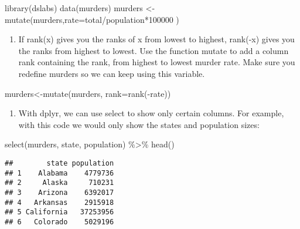\documentclass[
]{article}
\newenvironment{Shaded}{\begin{snugshade}}{\end{snugshade}}
\newcommand{\AttributeTok}[1]{\textcolor[rgb]{0.77,0.63,0.00}{#1}}
\newcommand{\DecValTok}[1]{\textcolor[rgb]{0.00,0.00,0.81}{#1}}
\newcommand{\FunctionTok}[1]{\textcolor[rgb]{0.00,0.00,0.00}{#1}}
\newcommand{\NormalTok}[1]{#1}
\newcommand{\OtherTok}[1]{\textcolor[rgb]{0.56,0.35,0.01}{#1}}
\newcommand{\SpecialCharTok}[1]{\textcolor[rgb]{0.00,0.00,0.00}{#1}}
\providecommand{\tightlist}{%
  \setlength{\itemsep}{0pt}\setlength{\parskip}{0pt}}
\begin{document}
\begin{Shaded}
\begin{Highlighting}[]
\FunctionTok{library}\NormalTok{(dslabs)}
\FunctionTok{data}\NormalTok{(murders)}
\NormalTok{murders }\OtherTok{\textless{}{-}} \FunctionTok{mutate}\NormalTok{(murders,}\AttributeTok{rate=}\NormalTok{total}\SpecialCharTok{/}\NormalTok{population}\SpecialCharTok{*}\DecValTok{100000}\NormalTok{ )}
\end{Highlighting}
\end{Shaded}

\begin{enumerate}
\def\labelenumi{\arabic{enumi}.}
\setcounter{enumi}{1}
\tightlist
\item
  If rank(x) gives you the ranks of x from lowest to highest, rank(-x)
  gives you the ranks from highest to lowest. Use the function mutate to
  add a column rank containing the rank, from highest to lowest murder
  rate. Make sure you redefine murders so we can keep using this
  variable.
\end{enumerate}

\begin{Shaded}
\begin{Highlighting}[]
\NormalTok{murders}\OtherTok{\textless{}{-}}\FunctionTok{mutate}\NormalTok{(murders, }\AttributeTok{rank=}\FunctionTok{rank}\NormalTok{(}\SpecialCharTok{{-}}\NormalTok{rate))}
\end{Highlighting}
\end{Shaded}

\begin{enumerate}
\def\labelenumi{\arabic{enumi}.}
\setcounter{enumi}{2}
\tightlist
\item
  With dplyr, we can use select to show only certain columns. For
  example, with this code we would only show the states and population
  sizes:
\end{enumerate}

\begin{Shaded}
\begin{Highlighting}[]
\FunctionTok{select}\NormalTok{(murders, state, population) }\SpecialCharTok{\%\textgreater{}\%} \FunctionTok{head}\NormalTok{()}
\end{Highlighting}
\end{Shaded}

\begin{verbatim}
##        state population
## 1    Alabama    4779736
## 2     Alaska     710231
## 3    Arizona    6392017
## 4   Arkansas    2915918
## 5 California   37253956
## 6   Colorado    5029196
\end{verbatim}
\end{document}
